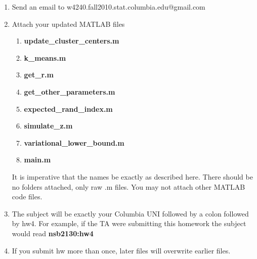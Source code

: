 \documentclass[12pt]{article}
\begin{document}
\begin{enumerate}
	\item Send an email to w4240.fall2010.stat.columbia.edu@gmail.com
	\item {Attach your updated MATLAB files 
		\begin{enumerate}
			\item {\bf update\_cluster\_centers.m} 
			\item	 {\bf k\_means.m}
			\item  {\bf get\_r.m}
			\item {\bf get\_other\_parameters.m}
			\item  {\bf expected\_rand\_index.m}
			\item {\bf simulate\_z.m}
			\item {\bf variational\_lower\_bound.m}
			\item  {\bf main.m}
		\end{enumerate} It is imperative that the names be exactly as described here. There should be no folders attached, only raw .m files.  You may not attach other MATLAB code files. }
	\item The subject will be exactly your Columbia UNI followed by a colon followed by hw4.  For example, if the TA were submitting this homework the subject would read {\bf nsb2130:hw4}
	\item If you submit hw more than once, later files will overwrite earlier files.
\end{enumerate}


\problemsdone
\end{document}
